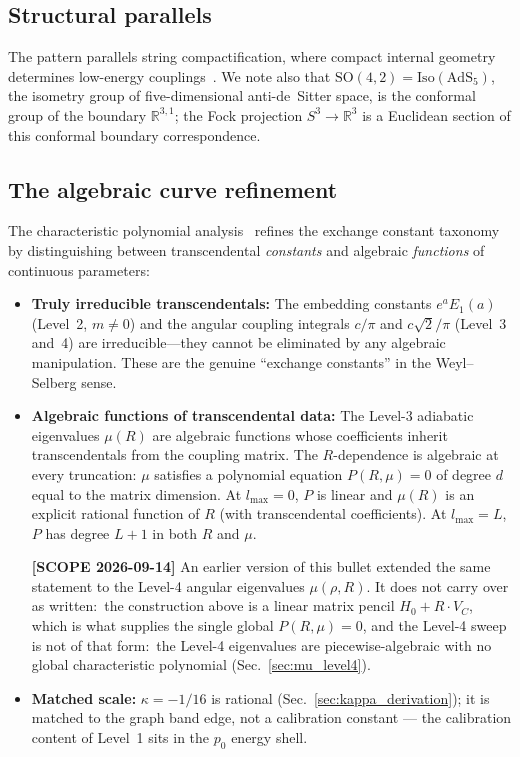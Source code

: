 \documentclass[aps,pra,twocolumn,superscriptaddress,longbibliography]{revtex4-2}
\begin{document}
\subsection{Structural parallels}

The pattern parallels string compactification, where compact internal
geometry determines low-energy couplings~\cite{polchinski1998}.
We note also that
$\mathrm{SO}(4,2) = \mathrm{Iso}(\mathrm{AdS}_5)$, the isometry group
of five-dimensional anti-de~Sitter space, is the conformal group of the
boundary $\mathbb{R}^{3,1}$; the Fock projection
$S^3 \to \mathbb{R}^3$ is a Euclidean section of this conformal
boundary correspondence.

\subsection{The algebraic curve refinement}
\label{sec:algebraic_curve}

The characteristic polynomial analysis~\cite{loutey_track_p1}
refines the exchange constant taxonomy by distinguishing between
transcendental \emph{constants} and algebraic \emph{functions} of
continuous parameters:
\begin{itemize}
  \item \textbf{Truly irreducible transcendentals:}
    The embedding constants $e^a E_1(a)$ (Level~2, $m \neq 0$) and the
    angular coupling integrals $c/\pi$ and $c\sqrt{2}/\pi$
    (Level~3 and~4) are irreducible---they cannot be eliminated by
    any algebraic manipulation.  These are the genuine ``exchange
    constants'' in the Weyl--Selberg sense.
  \item \textbf{Algebraic functions of transcendental data:}
    The Level-3 adiabatic eigenvalues $\mu(R)$ are
    algebraic functions whose coefficients inherit transcendentals
    from the coupling matrix.  The $R$-dependence
    is algebraic at every truncation: $\mu$ satisfies a polynomial
    equation $P(R,\mu) = 0$ of degree $d$ equal to the matrix dimension.
    At $l_{\max} = 0$, $P$ is linear and $\mu(R)$ is an explicit
    rational function of $R$ (with transcendental coefficients).
    At $l_{\max} = L$, $P$ has degree $L+1$ in both $R$ and $\mu$.

    \textbf{[SCOPE 2026-09-14]} An earlier version of this bullet extended
    the same statement to the Level-4 angular eigenvalues $\mu(\rho,R)$.
    It does not carry over as written:\ the construction above is a linear
    matrix pencil $H_0 + R \cdot V_C$, which is what supplies the single
    global $P(R,\mu) = 0$, and the Level-4 sweep is not of that form:\
    the Level-4 eigenvalues are piecewise-algebraic with no global
    characteristic polynomial (Sec.~\ref{sec:mu_level4}).
  \item \textbf{Matched scale:} $\kappa = -1/16$ is rational
    (Sec.~\ref{sec:kappa_derivation}); it is matched to the graph band
    edge, not a calibration constant --- the calibration content of
    Level~1 sits in the $p_0$ energy shell.
\end{itemize}
\end{document}
